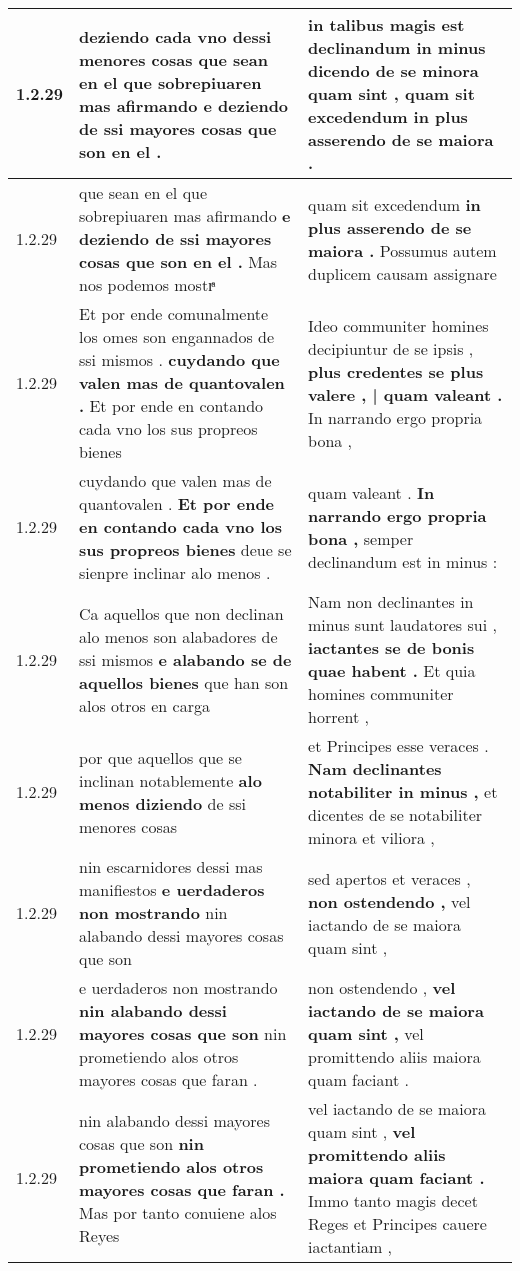 \begin{tabular}{|p{1cm}|p{6.5cm}|p{6.5cm}|}
1.2.29 & deziendo cada vno dessi menores cosas \textbf{ que sean en el que sobrepiuaren mas afirmando } e deziendo de ssi mayores cosas que son en el . & in talibus magis est declinandum in minus dicendo de se minora quam sint , \textbf{ quam sit excedendum } in plus asserendo de se maiora . \\\hline
1.2.29 & que sean en el que sobrepiuaren mas afirmando \textbf{ e deziendo de ssi mayores cosas que son en el . } Mas nos podemos mostrͣ & quam sit excedendum \textbf{ in plus asserendo de se maiora . } Possumus autem duplicem causam assignare \\\hline
1.2.29 & Et por ende comunalmente los omes son engannados de ssi mismos . \textbf{ cuydando que valen mas de quantovalen . } Et por ende en contando cada vno los sus propreos bienes & Ideo communiter homines decipiuntur de se ipsis , \textbf{ plus credentes se plus valere , | quam valeant . } In narrando ergo propria bona , \\\hline
1.2.29 & cuydando que valen mas de quantovalen . \textbf{ Et por ende en contando cada vno los sus propreos bienes } deue se sienpre inclinar alo menos . & quam valeant . \textbf{ In narrando ergo propria bona , } semper declinandum est in minus : \\\hline
1.2.29 & Ca aquellos que non declinan alo menos son alabadores de ssi mismos \textbf{ e alabando se de aquellos bienes } que han son alos otros en carga & Nam non declinantes in minus sunt laudatores sui , \textbf{ iactantes se de bonis quae habent . } Et quia homines communiter horrent , \\\hline
1.2.29 & por que aquellos que se inclinan notablemente \textbf{ alo menos diziendo } de ssi menores cosas & et Principes esse veraces . \textbf{ Nam declinantes notabiliter in minus , } et dicentes de se notabiliter minora et viliora , \\\hline
1.2.29 & nin escarnidores dessi mas manifiestos \textbf{ e uerdaderos non mostrando } nin alabando dessi mayores cosas que son & sed apertos et veraces , \textbf{ non ostendendo , } vel iactando de se maiora quam sint , \\\hline
1.2.29 & e uerdaderos non mostrando \textbf{ nin alabando dessi mayores cosas que son } nin prometiendo alos otros mayores cosas que faran . & non ostendendo , \textbf{ vel iactando de se maiora quam sint , } vel promittendo aliis maiora quam faciant . \\\hline
1.2.29 & nin alabando dessi mayores cosas que son \textbf{ nin prometiendo alos otros mayores cosas que faran . } Mas por tanto conuiene alos Reyes & vel iactando de se maiora quam sint , \textbf{ vel promittendo aliis maiora quam faciant . } Immo tanto magis decet Reges et Principes cauere iactantiam , \\\hline

\end{tabular}
